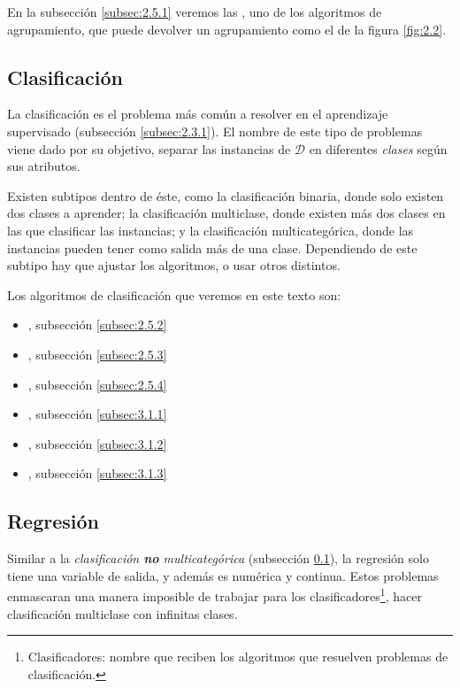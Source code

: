 En la subsección \ref{subsec:2.5.1} veremos las \emph{}, uno de los algoritmos de agrupamiento, que puede devolver un agrupamiento como el de la figura \ref{fig:2.2}.

\subsection{Clasificación} \label{subsec:2.4.2}

La clasificación es el problema más común a resolver en el aprendizaje supervisado (subsección \ref{subsec:2.3.1}). El nombre de este tipo de problemas viene dado por su objetivo, separar las instancias de $\mathcal{D}$ en diferentes \emph{clases} según sus atributos.

Existen subtipos dentro de éste, como la clasificación binaria, donde solo existen dos clases a aprender; la clasificación multiclase, donde existen más dos clases en las que clasificar las instancias; y la clasificación multicategórica, donde las instancias pueden tener como salida más de una clase. Dependiendo de este subtipo hay que ajustar los algoritmos, o usar otros distintos.

Los algoritmos de clasificación que veremos en este texto son:

\begin{itemize}
\item[\textbullet], subsección \ref{subsec:2.5.2}
\item[\textbullet], subsección \ref{subsec:2.5.3}
\item[\textbullet], subsección \ref{subsec:2.5.4}
\item[\textbullet], subsección \ref{subsec:3.1.1}
\item[\textbullet], subsección \ref{subsec:3.1.2}
\item[\textbullet], subsección \ref{subsec:3.1.3}
\end{itemize}

\subsection{Regresión} \label{subsec:2.4.3}

Similar a la \emph{clasificación \textbf{no} multicategórica} (subsección \ref{subsec:2.4.2}), la regresión solo tiene una variable de salida, y además es numérica y continua. Estos problemas enmascaran una manera imposible de trabajar para los clasificadores\footnote{Clasificadores: nombre que reciben los algoritmos que resuelven problemas de clasificación.}, hacer clasificación multiclase con infinitas clases.

